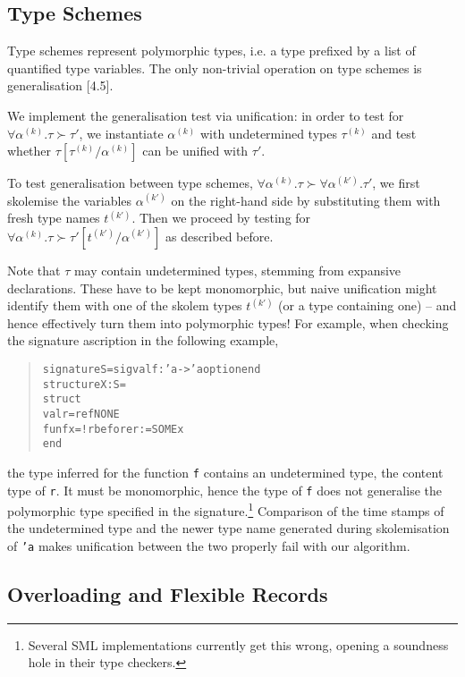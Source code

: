 \documentclass[twoside,titlepage]{article}
\begin{document}
\subsection{Type Schemes}
\label{typeschemes}

Type schemes represent polymorphic types, i.e. a type prefixed by a list of quantified type variables. The only non-trivial operation on type schemes is generalisation [4.5].

We implement the generalisation test via unification: in order to test for $\forall\alpha^{(k)}.\tau \succ \tau'$, we instantiate $\alpha^{(k)}$ with undetermined types $\tau^{(k)}$ and test whether $\tau[\tau^{(k)}/\alpha^{(k)}]$ can be unified with $\tau'$.

To test generalisation between type schemes, $\forall\alpha^{(k)}.\tau \succ \forall\alpha^{(k')}.\tau'$, we first skolemise the variables $\alpha^{(k')}$ on the right-hand side by substituting them with fresh type names $t^{(k')}$. Then we proceed by testing for $\forall\alpha^{(k)}.\tau \succ \tau'[t^{(k')}/\alpha^{(k')}]$ as described before.

Note that $\tau$ may contain undetermined types, stemming from expansive declarations. These have to be kept monomorphic, but naive unification might identify them with one of the skolem types $t^{(k')}$ (or a type containing one) -- and hence effectively turn them into polymorphic types! For example, when checking the signature ascription in the following example,
\begin{quote}
\begin{alltt}
signature S = sig val f : 'a -> 'a option end
structure X : S =
struct
    val r = ref NONE
    fun f x = !r before r := SOME x
end
\end{alltt}
\end{quote}
the type inferred for the function {\tt f} contains an undetermined type, the content type of {\tt r}. It must be monomorphic, hence the type of {\tt f} does not generalise the polymorphic type specified in the signature.\footnote{Several SML implementations currently get this wrong, opening a soundness hole in their type checkers.} Comparison of the time stamps of the undetermined type and the newer type name generated during skolemisation of {\tt 'a} makes unification between the two properly fail with our algorithm.


\subsection{Overloading and Flexible Records}
\label{overloading}
\end{document}
